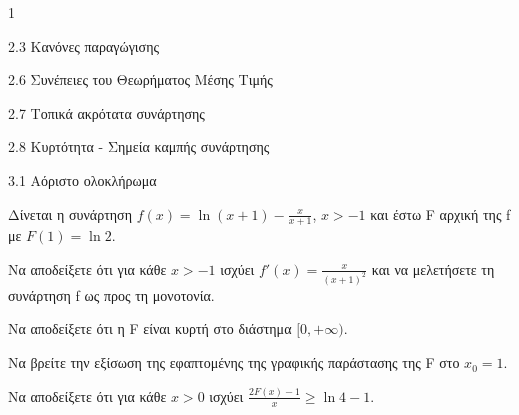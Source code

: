 \begin{ylh}{1}
    \item 2.3 Κανόνες παραγώγισης
    \item 2.6 Συνέπειες του Θεωρήματος Μέσης Τιμής
    \item 2.7 Τοπικά ακρότατα συνάρτησης
    \item 2.8 Κυρτότητα - Σημεία καμπής συνάρτησης
    \item 3.1 Αόριστο ολοκλήρωμα
\end{ylh}
Δίνεται η συνάρτηση $f(x)=\ln(x+1)-\frac{x}{x+1}$, $x>-1$ και έστω F αρχική της f με $F(1)=\ln2$.
\begin{alist}
    \item Να αποδείξετε ότι για κάθε $x>-1$ ισχύει $f'(x)=\frac{x}{(x+1)^2}$ και να μελετήσετε τη συνάρτηση f ως προς τη μονοτονία. 
    \item Να αποδείξετε ότι η F είναι κυρτή στο διάστημα $[0, +\infty)$. 
    \item \begin{rlist}
        \item Να βρείτε την εξίσωση της εφαπτομένης της γραφικής παράστασης της F στο $x_0=1$. 
        \item Να αποδείξετε ότι για κάθε $x>0$ ισχύει $\frac{2F(x)-1}{x} \ge \ln4-1$. 
    \end{rlist}
\end{alist}